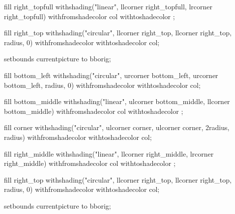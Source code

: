 	fill right_topfull
		withshading("linear", llcorner right_topfull, lrcorner right_topfull)
		withfromshadecolor col
		withtoshadecolor   ;

	fill right_top
		withshading("circular", llcorner right_top, llcorner right_top, radius, 0)
		withfromshadecolor 
		withtoshadecolor   col;

	setbounds currentpicture to bborig;
\stopuseMPgraphic



	fill bottom_left
		withshading("circular", urcorner bottom_left, urcorner bottom_left, radius, 0)
		withfromshadecolor 
		withtoshadecolor   col;

	fill bottom_middle
		withshading("linear", ulcorner bottom_middle, llcorner bottom_middle)
		withfromshadecolor col
		withtoshadecolor   ;

	fill corner
		withshading("circular", ulcorner corner, ulcorner corner, 2radius, radius)
		withfromshadecolor 
		withtoshadecolor   col;

	fill right_middle
		withshading("linear", llcorner right_middle, lrcorner right_middle)
		withfromshadecolor col
		withtoshadecolor   ;

	fill right_top
		withshading("circular", llcorner right_top, llcorner right_top, radius, 0)
		withfromshadecolor 
		withtoshadecolor   col;

	setbounds currentpicture to bborig;
\stopuseMPgraphic

\protect

\stopmodule
